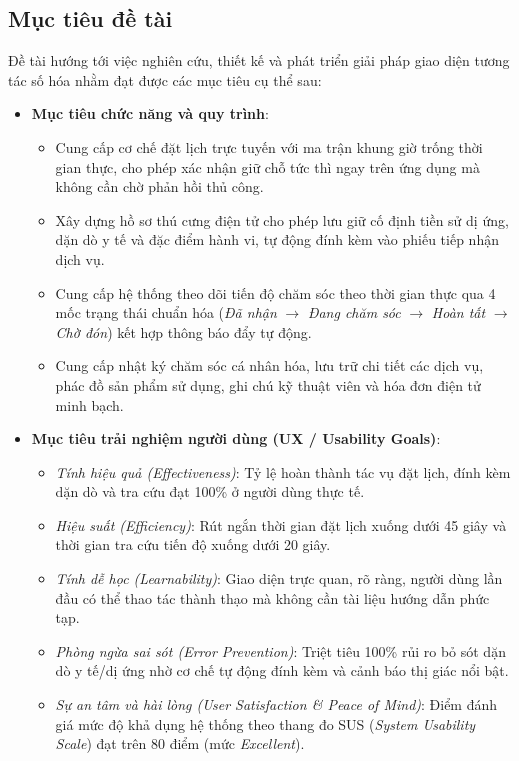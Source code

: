 \subsection{Mục tiêu đề tài}
Đề tài hướng tới việc nghiên cứu, thiết kế và phát triển giải pháp giao diện tương tác số hóa nhằm đạt được các mục tiêu cụ thể sau:
\begin{itemize}
    \item \textbf{Mục tiêu chức năng và quy trình}:
    \begin{itemize}
        \item Cung cấp cơ chế đặt lịch trực tuyến với ma trận khung giờ trống thời gian thực, cho phép xác nhận giữ chỗ tức thì ngay trên ứng dụng mà không cần chờ phản hồi thủ công.
        \item Xây dựng hồ sơ thú cưng điện tử cho phép lưu giữ cố định tiền sử dị ứng, dặn dò y tế và đặc điểm hành vi, tự động đính kèm vào phiếu tiếp nhận dịch vụ.
        \item Cung cấp hệ thống theo dõi tiến độ chăm sóc theo thời gian thực qua 4 mốc trạng thái chuẩn hóa (\textit{Đã nhận} $\rightarrow$ \textit{Đang chăm sóc} $\rightarrow$ \textit{Hoàn tất} $\rightarrow$ \textit{Chờ đón}) kết hợp thông báo đẩy tự động.
        \item Cung cấp nhật ký chăm sóc cá nhân hóa, lưu trữ chi tiết các dịch vụ, phác đồ sản phẩm sử dụng, ghi chú kỹ thuật viên và hóa đơn điện tử minh bạch.
    \end{itemize}
    \item \textbf{Mục tiêu trải nghiệm người dùng (UX / Usability Goals)}:
    \begin{itemize}
        \item \textit{Tính hiệu quả (Effectiveness)}: Tỷ lệ hoàn thành tác vụ đặt lịch, đính kèm dặn dò và tra cứu đạt 100\% ở người dùng thực tế.
        \item \textit{Hiệu suất (Efficiency)}: Rút ngắn thời gian đặt lịch xuống dưới 45 giây và thời gian tra cứu tiến độ xuống dưới 20 giây.
        \item \textit{Tính dễ học (Learnability)}: Giao diện trực quan, rõ ràng, người dùng lần đầu có thể thao tác thành thạo mà không cần tài liệu hướng dẫn phức tạp.
        \item \textit{Phòng ngừa sai sót (Error Prevention)}: Triệt tiêu 100\% rủi ro bỏ sót dặn dò y tế/dị ứng nhờ cơ chế tự động đính kèm và cảnh báo thị giác nổi bật.
        \item \textit{Sự an tâm và hài lòng (User Satisfaction \& Peace of Mind)}: Điểm đánh giá mức độ khả dụng hệ thống theo thang đo SUS (\textit{System Usability Scale}) đạt trên 80 điểm (mức \textit{Excellent}).
    \end{itemize}
\end{itemize}

